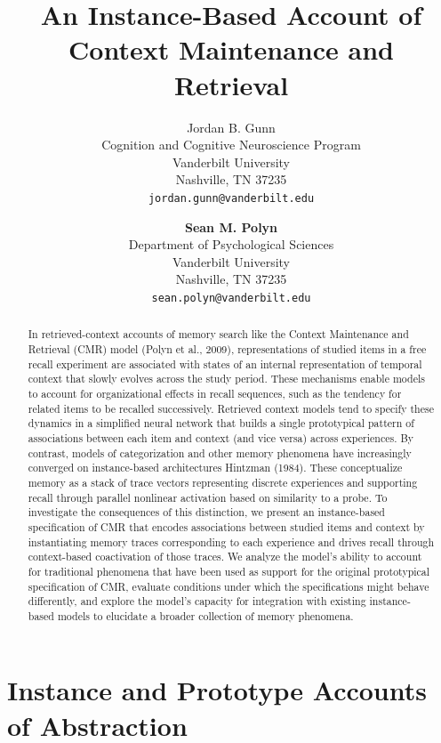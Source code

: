 \documentclass[
  letterpaper,
  DIV=11,
  numbers=noendperiod]{scrreport}
\title{An Instance-Based Account of Context Maintenance and Retrieval}
\author{Jordan B. Gunn\\
Cognition and Cognitive Neuroscience Program\\
Vanderbilt University\\
Nashville, TN 37235\\
\texttt{jordan.gunn@vanderbilt.edu} \and \textbf{Sean M. Polyn}\\
Department of Psychological Sciences\\
Vanderbilt University\\
Nashville, TN 37235\\
\texttt{sean.polyn@vanderbilt.edu}}
\date{}
\begin{document}
\maketitle
\begin{abstract}
In retrieved-context accounts of memory search like the Context
Maintenance and Retrieval (CMR) model (Polyn et al., 2009),
representations of studied items in a free recall experiment are
associated with states of an internal representation of temporal context
that slowly evolves across the study period. These mechanisms enable
models to account for organizational effects in recall sequences, such
as the tendency for related items to be recalled successively. Retrieved
context models tend to specify these dynamics in a simplified neural
network that builds a single prototypical pattern of associations
between each item and context (and vice versa) across experiences. By
contrast, models of categorization and other memory phenomena have
increasingly converged on instance-based architectures Hintzman (1984).
These conceptualize memory as a stack of trace vectors representing
discrete experiences and supporting recall through parallel nonlinear
activation based on similarity to a probe. To investigate the
consequences of this distinction, we present an instance-based
specification of CMR that encodes associations between studied items and
context by instantiating memory traces corresponding to each experience
and drives recall through context-based coactivation of those traces. We
analyze the model's ability to account for traditional phenomena that
have been used as support for the original prototypical specification of
CMR, evaluate conditions under which the specifications might behave
differently, and explore the model's capacity for integration with
existing instance-based models to elucidate a broader collection of
memory phenomena.
\end{abstract}
\ifdefined\Shaded\renewenvironment{Shaded}{\begin{tcolorbox}[frame hidden, borderline west={3pt}{0pt}{shadecolor}, enhanced, interior hidden, boxrule=0pt, breakable, sharp corners]}{\end{tcolorbox}}\fi


\hypertarget{instance-and-prototype-accounts-of-abstraction}{%
\chapter{Instance and Prototype Accounts of
Abstraction}\label{instance-and-prototype-accounts-of-abstraction}}
\end{document}
